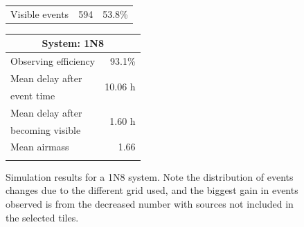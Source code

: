 \begin{colsection}
\begin{colsection}
\begin{figure}[p]
\begin{center}
\begin{minipage}[t]{0.37\textwidth}
\begin{tabular}{lrr}
                \midrule
                Visible events & 594 &  53.8\% \\
            \end{tabular}
        \end{minipage}
        \begin{minipage}[t]{0.35\textwidth}\vspace{0pt}
            \begin{tabular}{lr}
                \multicolumn{2}{c}{\textbf{System: 1N8}} \\
                \midrule
                Observing efficiency & 93.1\% \\
                \midrule
                Mean delay after     & \multirow{2}{*}{10.06 h} \\
                event time           & \\
                Mean delay after     & \multirow{2}{*}{1.60 h} \\
                becoming visible     & \\
                \midrule
                Mean airmass         & 1.66 \\
                & \\
            \end{tabular}
        \end{minipage}
    \end{center}
    \caption[GW simulation results: 1N8 system]{
        Simulation results for a 1N8 system. Note the distribution of events changes due to the different grid used, and the biggest gain in events observed is from the decreased number with sources not included in the selected tiles.
    }\label{fig:gw_sim_1n8}
\end{figure}


\end{colsection}
\end{colsection}
